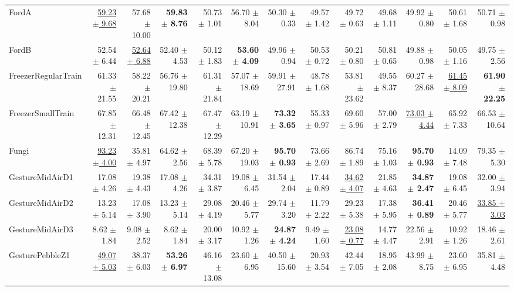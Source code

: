 \begin{landscape}
\begin{longtable}{lrrrrrrrrrrrr}
FordA & \underline{59.23 $\pm$ 9.68} & 57.68 $\pm$ 10.00 & \textbf{59.83 $\pm$ 8.76} & 50.73 $\pm$ 1.01 & 56.70 $\pm$ 8.04 & 50.30 $\pm$ 0.33 & 49.57 $\pm$ 1.42 & 49.72 $\pm$ 0.63 & 49.68 $\pm$ 1.11 & 49.92 $\pm$ 0.80 & 50.61 $\pm$ 1.68 & 50.71 $\pm$ 0.98 \\
FordB & 52.54 $\pm$ 6.44 & \underline{52.64 $\pm$ 6.88} & 52.40 $\pm$ 4.53 & 50.12 $\pm$ 1.83 & \textbf{53.60 $\pm$ 4.09} & 49.96 $\pm$ 0.94 & 50.53 $\pm$ 0.72 & 50.21 $\pm$ 0.80 & 50.81 $\pm$ 0.65 & 49.88 $\pm$ 0.98 & 50.05 $\pm$ 1.16 & 49.75 $\pm$ 2.56 \\
FreezerRegularTrain & 61.33 $\pm$ 21.55 & 58.22 $\pm$ 20.21 & 56.76 $\pm$ 19.80 & 61.31 $\pm$ 21.84 & 57.07 $\pm$ 18.69 & 59.91 $\pm$ 27.91 & 48.78 $\pm$ 1.68 & 53.81 $\pm$ 23.62 & 49.55 $\pm$ 8.37 & 60.27 $\pm$ 28.68 & \underline{61.45 $\pm$ 8.09} & \textbf{61.90 $\pm$ 22.25} \\
FreezerSmallTrain & 67.85 $\pm$ 12.31 & 66.48 $\pm$ 12.45 & 67.42 $\pm$ 12.38 & 67.47 $\pm$ 12.29 & 63.19 $\pm$ 10.91 & \textbf{73.32 $\pm$ 3.65} & 55.33 $\pm$ 0.97 & 69.60 $\pm$ 5.96 & 57.00 $\pm$ 2.79 & \underline{73.03 $\pm$ 4.44} & 65.92 $\pm$ 7.33 & 66.53 $\pm$ 10.64 \\
Fungi & \underline{93.23 $\pm$ 4.00} & 35.81 $\pm$ 4.97 & 64.62 $\pm$ 2.56 & 68.39 $\pm$ 5.78 & 67.20 $\pm$ 19.03 & \textbf{95.70 $\pm$ 0.93} & 73.66 $\pm$ 2.69 & 86.74 $\pm$ 1.89 & 75.16 $\pm$ 1.03 & \textbf{95.70 $\pm$ 0.93} & 14.09 $\pm$ 7.48 & 79.35 $\pm$ 5.30 \\
GestureMidAirD1 & 17.08 $\pm$ 4.26 & 19.38 $\pm$ 4.43 & 17.08 $\pm$ 4.26 & 34.31 $\pm$ 3.87 & 19.08 $\pm$ 6.45 & 31.54 $\pm$ 2.04 & 17.44 $\pm$ 0.89 & \underline{34.62 $\pm$ 4.07} & 21.85 $\pm$ 4.63 & \textbf{34.87 $\pm$ 2.47} & 19.08 $\pm$ 6.45 & 32.00 $\pm$ 3.94 \\
GestureMidAirD2 & 13.23 $\pm$ 5.14 & 17.08 $\pm$ 3.90 & 13.23 $\pm$ 5.14 & 29.08 $\pm$ 4.19 & 20.46 $\pm$ 5.77 & 29.74 $\pm$ 3.20 & 11.79 $\pm$ 2.22 & 29.23 $\pm$ 5.38 & 17.38 $\pm$ 5.95 & \textbf{36.41 $\pm$ 0.89} & 20.46 $\pm$ 5.77 & \underline{33.85 $\pm$ 3.03} \\
GestureMidAirD3 & 8.62 $\pm$ 1.84 & 9.08 $\pm$ 2.52 & 8.62 $\pm$ 1.84 & 20.00 $\pm$ 3.17 & 10.92 $\pm$ 1.26 & \textbf{24.87 $\pm$ 4.24} & 9.49 $\pm$ 1.60 & \underline{23.08 $\pm$ 0.77} & 14.77 $\pm$ 4.47 & 22.56 $\pm$ 2.91 & 10.92 $\pm$ 1.26 & 18.46 $\pm$ 2.61 \\
GesturePebbleZ1 & \underline{49.07 $\pm$ 5.03} & 38.37 $\pm$ 6.03 & \textbf{53.26 $\pm$ 6.97} & 46.16 $\pm$ 13.08 & 23.60 $\pm$ 6.95 & 40.50 $\pm$ 15.60 & 20.93 $\pm$ 3.54 & 42.44 $\pm$ 7.05 & 18.95 $\pm$ 2.08 & 43.99 $\pm$ 8.75 & 23.60 $\pm$ 6.95 & 35.81 $\pm$ 4.48 \\

\end{longtable}
\end{landscape}
